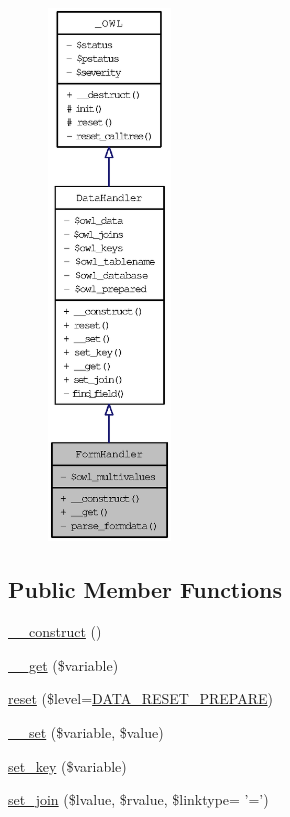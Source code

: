 \begin{figure}[H]
\begin{center}
\leavevmode
\includegraphics[height=400pt]{classFormHandler__coll__graph}
\end{center}
\end{figure}
\subsection*{Public Member Functions}
\begin{CompactItemize}
\item 
\hyperlink{classFormHandler_1ef7ad4fe143dd8339c8ab66423a1934}{\_\-\_\-construct} ()
\item 
\hyperlink{classFormHandler_371b8ded5110c6d66bc3a0c3e08fe085}{\_\-\_\-get} (\$variable)
\item 
\hyperlink{classDataHandler_b89e1aaad9cd0a37f1c7f13c1d9c0d57}{reset} (\$level=\hyperlink{class_8datahandler_8php_19a99423705b41e563424ae76d7fe184}{DATA\_\-RESET\_\-PREPARE})
\item 
\hyperlink{classDataHandler_16c81c9564a7feaf530ce5d51ed99df7}{\_\-\_\-set} (\$variable, \$value)
\item 
\hyperlink{classDataHandler_32ce223478b78a4ea9838a3c6ac7440c}{set\_\-key} (\$variable)
\item 
\hyperlink{classDataHandler_9b77733f02e9d6281fc40df110c0ba70}{set\_\-join} (\$lvalue, \$rvalue, \$linktype= '=')
\end{CompactItemize}
